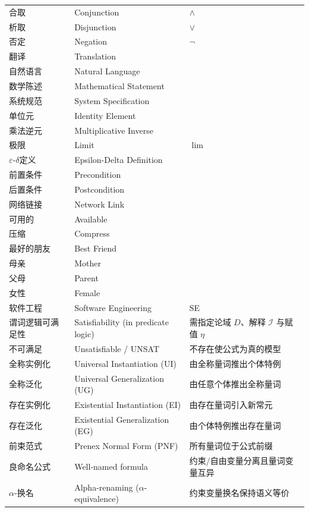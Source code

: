 \documentclass[UTF8,11pt,a4paper]{ctexbook}   %
\theoremstyle{definition}
\begin{document}
\begin{longtable}{|p{4.8cm}|p{4.8cm}|p{4.8cm}|}
合取 & Conjunction & $\land$ \\
析取 & Disjunction & $\lor$ \\
否定 & Negation & $\neg$ \\
翻译 & Translation & \\
自然语言 & Natural Language & \\
数学陈述 & Mathematical Statement & \\
系统规范 & System Specification & \\
单位元 & Identity Element & \\
乘法逆元 & Multiplicative Inverse & \\
极限 & Limit & $\lim$ \\
$\varepsilon$-$\delta$定义 & Epsilon-Delta Definition & \\
前置条件 & Precondition & \\
后置条件 & Postcondition & \\
网络链接 & Network Link & \\
可用的 & Available & \\
压缩 & Compress & \\
最好的朋友 & Best Friend & \\
母亲 & Mother & \\
父母 & Parent & \\
女性 & Female & \\
软件工程 & Software Engineering & SE \\ 
\hline
谓词逻辑可满足性 & Satisfiability (in predicate logic) & 需指定论域 $D$、解释 $\mathcal{I}$ 与赋值 $\eta$ \\
不可满足 & Unsatisfiable / UNSAT & 不存在使公式为真的模型 \\
全称实例化 & Universal Instantiation (UI) & 由全称量词推出个体特例 \\
全称泛化 & Universal Generalization (UG) & 由任意个体推出全称量词 \\
存在实例化 & Existential Instantiation (EI) & 由存在量词引入新常元 \\
存在泛化 & Existential Generalization (EG) & 由个体特例推出存在量词 \\
前束范式 & Prenex Normal Form (PNF) & 所有量词位于公式前缀 \\
良命名公式 & Well-named formula & 约束/自由变量分离且量词变量互异 \\
$\alpha$-换名 & Alpha-renaming ($\alpha$-equivalence) & 约束变量换名保持语义等价 \\
\hline
\end{longtable}
\normalsize
\end{document}
